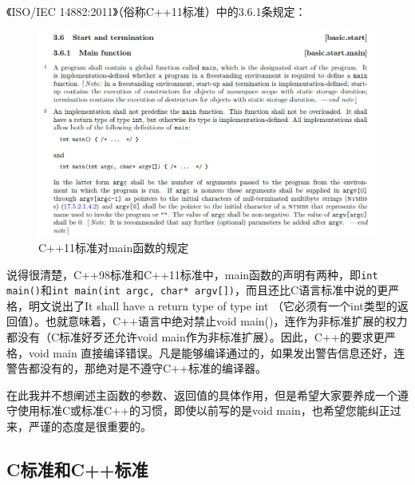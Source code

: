 \documentclass[11pt,twoside,a4paper,titlepage]{article}	%
\begin{document}
《ISO/IEC 14882:2011》（俗称C++11标准）中的3.6.1条规定：

\begin{figure}[H]
\centering
\includegraphics[scale=.45]{../src/cpp11main.jpg}
\caption{C++11标准对main函数的规定}
\label{fig:cpp11main}
\end{figure}

说得很清楚，C++98标准和C++11标准中，main函数的声明有两种，即\verb|int main()|和\verb|int main(int argc, char* argv[])|，而且还比C语言标准中说的更严格，明文说出了It shall have a return type of type int （它必须有一个int类型的返回值）。也就意味着，C++语言中绝对禁止void main()，连作为非标准扩展的权力都没有（C标准好歹还允许void main作为非标准扩展）。因此，C++的要求更严格，void main 直接编译错误。凡是能够编译通过的，如果发出警告信息还好，连警告都没有的，那绝对是不遵守C++标准的编译器。

在此我并不想阐述主函数的参数、返回值的具体作用，但是希望大家要养成一个遵守使用标准C或标准C++的习惯，即使以前写的是void main，也希望您能纠正过来，严谨的态度是很重要的。

\subsection{C标准和C++标准}
\end{document}
